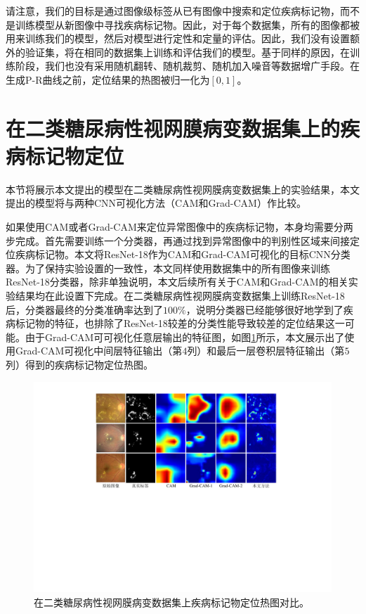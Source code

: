 请注意，我们的目标是通过图像级标签从已有图像中搜索和定位疾病标记物，而不是训练模型从新图像中寻找疾病标记物。因此，对于每个数据集，所有的图像都被用来训练我们的模型，然后对模型进行定性和定量的评估。因此，我们没有设置额外的验证集，将在相同的数据集上训练和评估我们的模型。基于同样的原因，在训练阶段，我们也没有采用随机翻转、随机裁剪、随机加入噪音等数据增广手段。在生成P-R曲线之前，定位结果的热图被归一化为$[0,1]$。

\section{在二类糖尿病性视网膜病变数据集上的疾病标记物定位}\label{sec:bin_dr_ds_experiment}
本节将展示本文提出的模型在二类糖尿病性视网膜病变数据集上的实验结果，本文提出的模型将与两种CNN可视化方法（CAM和Grad-CAM）作比较。

如果使用CAM或者Grad-CAM来定位异常图像中的疾病标记物，本身均需要分两步完成。首先需要训练一个分类器，再通过找到异常图像中的判别性区域来间接定位疾病标记物。本文将ResNet-18作为CAM和Grad-CAM可视化的目标CNN分类器。为了保持实验设置的一致性，本文同样使用数据集中的所有图像来训练ResNet-18分类器，除非单独说明，本文后续所有关于CAM和Grad-CAM的相关实验结果均在此设置下完成。在二类糖尿病性视网膜病变数据集上训练ResNet-18后，分类器最终的分类准确率达到了$100\%$，说明分类器已经能够很好地学到了疾病标记物的特征，也排除了ResNet-18较差的分类性能导致较差的定位结果这一可能。由于Grad-CAM可可视化任意层输出的特征图，如图\ref{fig:retinal_image_res}所示，本文展示出了使用Grad-CAM可视化中间层特征输出（第$4$列）和最后一层卷积层特征输出（第$5$列）得到的疾病标记物定位热图。
\begin{figure}[h]
	\centering
	\includegraphics[width=1.0\textwidth]{figure/retinal_image_res.pdf}
	\caption[在二类糖尿病性视网膜病变数据集上疾病标记物定位热图对比]{在二类糖尿病性视网膜病变数据集上疾病标记物定位热图对比。}
	\label{fig:retinal_image_res}
\end{figure}

